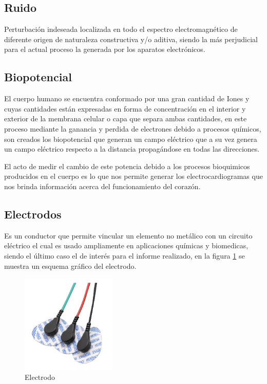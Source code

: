 \documentclass[conference]{IEEEtran}
\begin{document}
	\subsection{Ruido}
	
	Perturbación indeseada localizada en todo el espectro electromagnético de diferente origen de naturaleza constructiva y/o aditiva, siendo la más perjudicial para el actual proceso la generada por los aparatos electrónicos.
	
	\subsection{Biopotencial}
	El cuerpo humano se encuentra conformado por una gran cantidad de Iones y cuyas cantidades están expresadas en forma de concentración en el interior y exterior de la membrana celular o capa que separa ambas cantidades, en este proceso mediante la ganancia y perdida de electrones debido a procesos químicos, son creados los biopotencial que generan un campo eléctrico que a su vez genera un campo eléctrico respecto a la distancia propagándose en todas las direcciones.
	
	El acto de medir el cambio de este potencia debido a los procesos bioquimicos producidos en el cuerpo es lo que nos permite generar los electrocardiogramas que nos brinda información acerca del funcionamiento del corazón.
	
	\subsection{Electrodos}
	Es un conductor que permite vincular un elemento no metálico con un circuito eléctrico el cual es usado ampliamente en aplicaciones químicas y biomedicas, siendo el último caso el de interés para el informe realizado, en la figura \ref{fig:electrodo} se muestra un esquema gráfico del electrodo.
	
	\begin{figure}[h]
		\centering
		\includegraphics[width=0.4\textwidth]{media/electrodo}
		\caption{Electrodo}
		\label{fig:electrodo}
	\end{figure}
	
\end{document}
